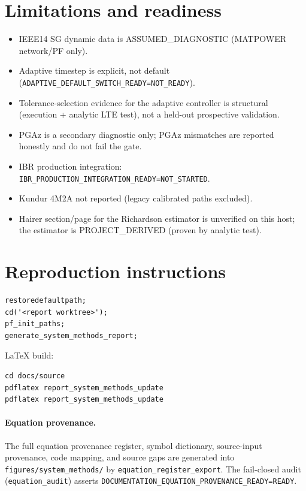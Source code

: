 \documentclass[12pt,a4paper]{article}
\begin{document}
\section{Limitations and readiness}

\begin{itemize}[leftmargin=1.5em]
\item IEEE14 SG dynamic data is ASSUMED\_DIAGNOSTIC (MATPOWER network/PF only).
\item Adaptive timestep is explicit, not default
      (\texttt{ADAPTIVE\_DEFAULT\_SWITCH\_READY=NOT\_READY}).
\item Tolerance-selection evidence for the adaptive controller is structural
      (execution + analytic LTE test), not a held-out prospective validation.
\item PGAz is a secondary diagnostic only; PGAz mismatches are reported
      honestly and do not fail the gate.
\item IBR production integration: \texttt{IBR\_PRODUCTION\_INTEGRATION\_READY=NOT\_STARTED}.
\item Kundur 4M2A not reported (legacy calibrated paths excluded).
\item Hairer section/page for the Richardson estimator is unverified on this
      host; the estimator is PROJECT\_DERIVED (proven by analytic test).
\end{itemize}

\section{Reproduction instructions}

\begin{lstlisting}
restoredefaultpath;
cd('<report worktree>');
pf_init_paths;
generate_system_methods_report;
\end{lstlisting}

LaTeX build:
\begin{lstlisting}
cd docs/source
pdflatex report_system_methods_update
pdflatex report_system_methods_update
\end{lstlisting}

\paragraph{Equation provenance.} The full equation provenance register, symbol
dictionary, source-input provenance, code mapping, and source gaps are
generated into \texttt{figures/system\_methods/} by
\texttt{equation\_register\_export}. The fail-closed audit
(\texttt{equation\_audit}) asserts \texttt{DOCUMENTATION\_EQUATION\_PROVENANCE\_READY=READY}.


\end{document}
